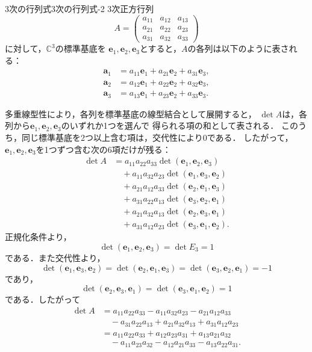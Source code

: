 \begin{example}{3次の行列式}{3次の行列式-2}
  $3$次正方行列
  \[
    A=
    \begin{pmatrix}
      a_{11} & a_{12} & a_{13}\\
      a_{21} & a_{22} & a_{23}\\
      a_{31} & a_{32} & a_{33}
    \end{pmatrix}
  \]
  に対して，$\mathbb{C}^3$の標準基底を
  $\bm{e}_1,\bm{e}_2,\bm{e}_3$とすると，$A$の各列は以下のように表される：
  \begin{align*}
    \bm{a}_1
    &=a_{11}\bm{e}_1+a_{21}\bm{e}_2+a_{31}\bm{e}_3, \\
    \bm{a}_2
    &=a_{12}\bm{e}_1+a_{22}\bm{e}_2+a_{32}\bm{e}_3, \\
    \bm{a}_3
    &=a_{13}\bm{e}_1+a_{23}\bm{e}_2+a_{33}\bm{e}_3.
  \end{align*}

多重線型性により，各列を標準基底の線型結合として展開すると，
$\det A$は，各列から$\bm{e}_1,\bm{e}_2,\bm{e}_3$のいずれか1つを選んで
得られる項の和として表される．
このうち，同じ標準基底を2つ以上含む項は，交代性により$0$である．
したがって，$\bm{e}_1,\bm{e}_2,\bm{e}_3$を1つずつ含む次の6項だけが残る：
  \begin{align*}
    \det A
    &=
    a_{11}a_{22}a_{33}
    \det(\bm{e}_1,\bm{e}_2,\bm{e}_3)\\
    &\quad
    +a_{11}a_{32}a_{23}
    \det(\bm{e}_1,\bm{e}_3,\bm{e}_2)\\
    &\quad
    +a_{21}a_{12}a_{33}
    \det(\bm{e}_2,\bm{e}_1,\bm{e}_3)\\
    &\quad
    +a_{31}a_{22}a_{13}
    \det(\bm{e}_3,\bm{e}_2,\bm{e}_1)\\
    &\quad
    +a_{21}a_{32}a_{13}
    \det(\bm{e}_2,\bm{e}_3,\bm{e}_1)\\
    &\quad
    +a_{31}a_{12}a_{23}
    \det(\bm{e}_3,\bm{e}_1,\bm{e}_2).
  \end{align*}
  正規化条件より，
  \[
    \det(\bm{e}_1,\bm{e}_2,\bm{e}_3)
    =\det E_3
    =1
  \]
  である．また交代性より，
  \[
    \det(\bm{e}_1,\bm{e}_3,\bm{e}_2)
    =
    \det(\bm{e}_2,\bm{e}_1,\bm{e}_3)
    =
    \det(\bm{e}_3,\bm{e}_2,\bm{e}_1)
    =-1
  \]
  であり，
  \[
    \det(\bm{e}_2,\bm{e}_3,\bm{e}_1)
    =
    \det(\bm{e}_3,\bm{e}_1,\bm{e}_2)
    =1
  \]
  である．したがって
  \begin{align*}
    \det A
    &=
    a_{11}a_{22}a_{33}
    -a_{11}a_{32}a_{23}
    -a_{21}a_{12}a_{33}\\
    &\quad
    -a_{31}a_{22}a_{13}
    +a_{21}a_{32}a_{13}
    +a_{31}a_{12}a_{23}\\
    &=
    a_{11}a_{22}a_{33}
    +a_{12}a_{23}a_{31}
    +a_{13}a_{21}a_{32}\\
    &\quad
    -a_{11}a_{23}a_{32}
    -a_{12}a_{21}a_{33}
    -a_{13}a_{22}a_{31}.
  \end{align*}
\end{example}

